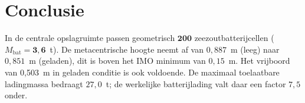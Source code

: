 \section*{Conclusie}
\label{sec:stab_conclusie}

In de centrale opslagruimte passen geometrisch $\mathbf{200}$
zeezoutbatterijcellen ($M_\mathrm{bat} = \mathbf{3{,}6}$~t). De
metacentrische hoogte neemt af van $0{,}887$~m (leeg) naar $0{,}851$~m
(geladen), dit is boven het IMO minimum van $0{,}15$~m. Het vrijboord van 0{,}503~m in geladen conditie
is ook voldoende. De maximaal toelaatbare ladingmassa bedraagt
$27{,}0$~t; de werkelijke batterijlading valt daar een factor $7{,}5$
onder.